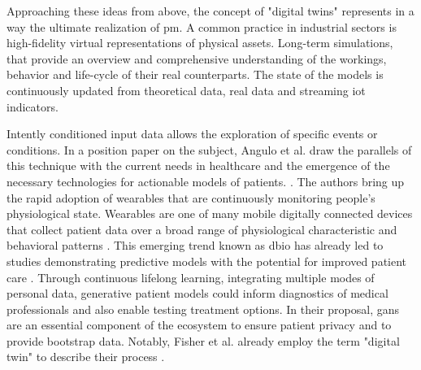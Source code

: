     Approaching these ideas from above, the concept of "digital twins" represents in a way the ultimate realization of \gls{pm}. A common practice in industrial sectors is high-fidelity virtual representations of physical assets. Long-term simulations, that provide an overview and comprehensive understanding of the workings, behavior and life-cycle of their real counterparts. The state of the models is continuously updated from theoretical data, real data and streaming \gls{iot} indicators.\par
    Intently conditioned input data allows the exploration of specific events or conditions. In a position paper on the subject, Angulo et al. draw the parallels of this technique with the current needs in healthcare and the emergence of the necessary technologies for actionable models of patients. \cite{angulo2019towards,Angulo_2020}. The authors bring up the rapid adoption of wearables that are continuously monitoring people's physiological state. 
    Wearables are one of many mobile digitally connected devices that collect patient data over a broad range of physiological characteristic and behavioral patterns \cite{coravos2019developing}. This emerging trend known as \gls{dbio} has already led to studies demonstrating predictive models with the potential for improved patient care \cite{snyder2018best}. Through continuous lifelong learning, integrating  multiple modes of personal data, generative patient models could inform diagnostics of medical professionals and also enable testing treatment options. In their proposal, \glspl{gan} are an essential component of the ecosystem to ensure patient privacy and to provide bootstrap data. Notably, Fisher et al. already employ the term "digital twin" to describe their process \cite{walsh2020generating}.
        
